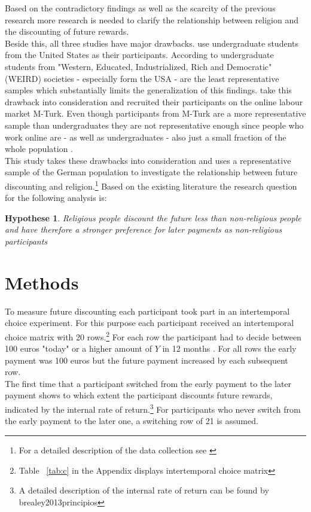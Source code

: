 \documentclass[10pt,a4paper]{article}
\newtheorem{hyp}{Hypothese}
\begin{document}
Based on the contradictory findings as well as the scarcity of the previous research more research is needed to clarify the relationship between religion and the discounting of future rewards.\\
Beside this, all three studies have major drawbacks. \textcite{carter2012religious, benjamin2010religious} use undergraduate students from the United States as their participants. According to \textcite{henrich2010weirdest} undergraduate students from "Western, Educated, Industrialized, Rich and Democratic" (WEIRD) societies - especially form the USA - are the least representative samples which substantially limits the generalization of this findings. \textcite{thornton2015divine} take this drawback into consideration and recruited their participants on the online labour market M-Turk. Even though participants from M-Turk are a more representative sample than undergraduates they are not representative enough since people who work online are - as well as undergraduates - also just a small fraction of the whole population \parencite{horton2011online}.\\

This study takes these drawbacks into consideration and uses a representative sample of the German population to investigate the relationship between future discounting and religion.\footnote{For a detailed description of the data collection see \textcite{dohmen2010risk}}
Based on the existing literature the research question for the following analysis is: 
\begin{hyp}
Religious people discount the future less than non-religious people and have therefore a stronger preference for later payments as non-religious participants
\end{hyp}

\section{Methods}
To measure future discounting each participant took part in an intertemporal choice experiment. For this purpose each participant received an intertemporal choice matrix with 20 rows.\footnote{Table ~\ref{tab:c} in the Appendix displays intertemporal choice matrix} For each row the participant had to decide between 100 euros "today" or a higher amount of $Y$ in 12 months \parencite{dohmen2010risk}. For all rows the early payment was 100 euros but the future payment increased by each subsequent row.\\
The first time that a participant switched from the early payment to the later payment shows to which extent the participant discounts future rewards, indicated by the internal rate of return.\footnote{A detailed description of the internal rate of return can be found by brealey2013principios} For participants who never switch from the early payment to the later one, a switching row of 21 is assumed.\\  
\end{document}
